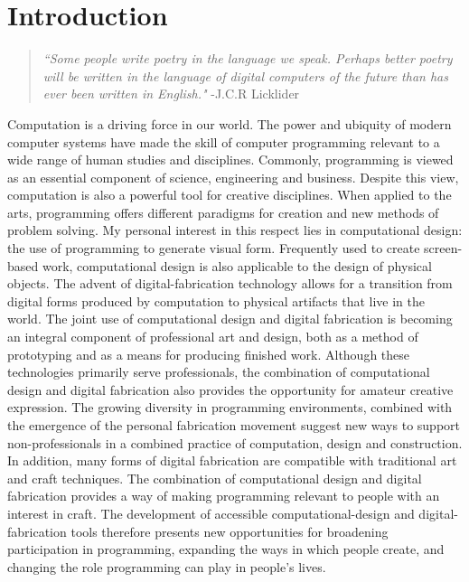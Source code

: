 \chapter{Introduction}
\begin{quotation}

\textit{``Some people write poetry in the language we speak. Perhaps better poetry will be written in the language of digital computers of the future than has ever been written in English."}
-J.C.R Licklider
\end{quotation}


Computation is a driving force in our world. The power and ubiquity of modern computer systems have made the skill of computer programming relevant to a wide range of human studies and disciplines. Commonly, programming is viewed as an essential component of science, engineering and business. Despite this view, computation is also a powerful tool for creative disciplines. When applied to the arts, programming offers different paradigms for creation and new methods of problem solving. My personal interest in this respect lies in computational design: the use of programming to generate visual form. Frequently used to create screen-based work, computational design is also applicable to the design of physical objects. The advent of digital-fabrication technology allows for a transition from digital forms produced by computation to physical artifacts that live in the world. The joint use of computational design and digital fabrication is becoming an integral component of professional art and design, both as a method of prototyping and as a means for producing finished work. Although these technologies primarily serve professionals, the combination of computational design and digital fabrication also provides the opportunity for amateur creative expression. The growing diversity in programming environments, combined with the emergence of the personal fabrication movement suggest new ways to support non-professionals in a combined practice of computation, design and construction. In addition, many forms of digital fabrication are compatible with traditional art and craft techniques. The combination of computational design and digital fabrication provides a way of making programming relevant to people with an interest in craft. The development of accessible computational-design and digital-fabrication tools therefore presents new opportunities for broadening participation in programming, expanding the ways in which people create, and changing the role programming can play in people's lives.

